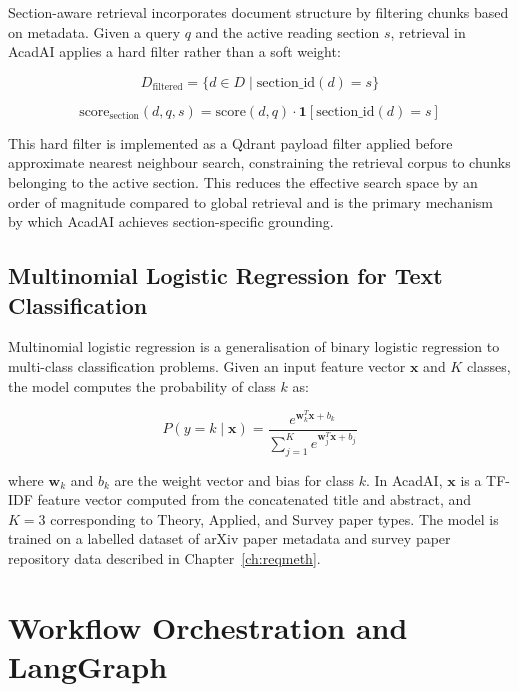 \documentclass[12pt,a4paper]{report}
\begin{document}
Section-aware retrieval incorporates document structure by filtering chunks
based on metadata. Given a query $q$ and the active reading section $s$,
retrieval in AcadAI applies a hard filter rather than a soft weight:

\begin{equation}
D_{\text{filtered}} = \{d \in D \mid \text{section\_id}(d) = s\}
\end{equation}

\begin{equation}
\text{score}_{\text{section}}(d, q, s) = \text{score}(d, q) \cdot
\mathbf{1}[\text{section\_id}(d) = s]
\end{equation}

This hard filter is implemented as a Qdrant payload filter applied before
approximate nearest neighbour search, constraining the retrieval corpus to
chunks belonging to the active section. This reduces the effective search space
by an order of magnitude compared to global retrieval and is the primary
mechanism by which AcadAI achieves section-specific grounding.

\subsection{Multinomial Logistic Regression for Text Classification}

Multinomial logistic regression is a generalisation of binary logistic
regression to multi-class classification problems. Given an input feature vector
$\mathbf{x}$ and $K$ classes, the model computes the probability of class $k$
as:

\begin{equation}
P(y = k \mid \mathbf{x}) = \frac{e^{\mathbf{w}_k^T \mathbf{x} + b_k}}
{\sum_{j=1}^{K} e^{\mathbf{w}_j^T \mathbf{x} + b_j}}
\end{equation}

where $\mathbf{w}_k$ and $b_k$ are the weight vector and bias for class $k$. In
AcadAI, $\mathbf{x}$ is a TF-IDF feature vector computed from the concatenated
title and abstract, and $K = 3$ corresponding to Theory, Applied, and Survey
paper types. The model is trained on a labelled dataset of arXiv paper metadata
and survey paper repository data described in Chapter~\ref{ch:reqmeth}.

\section{Workflow Orchestration and LangGraph}
\end{document}
